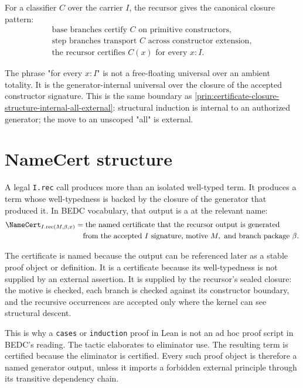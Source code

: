 For a classifier $C$ over the carrier $I$, the recursor gives the canonical closure pattern:
$$
\begin{aligned}
\text{base branches certify } C \text{ on primitive constructors},\\
\text{step branches transport } C \text{ across constructor extension},\\
\hline
\text{the recursor certifies } C(x) \text{ for every } x:I.
\end{aligned}
$$

The phrase "for every $x:I$" is not a free-floating universal over an ambient totality. It is the generator-internal universal over the closure of the accepted constructor signature. This is the same boundary as \autoref{prin:certificate-closure-structure-internal-all-external}: structural induction is internal to an authorized generator; the move to an unscoped "all" is external.

\section{NameCert structure}
\label{sec:recursor-namecert-structure}

A legal \texttt{I.rec} call produces more than an isolated well-typed term. It produces a term whose well-typedness is backed by the closure of the generator that produced it. In BEDC vocabulary, that output is a \NameCert{} at the relevant name:
$$
\begin{aligned}
\NameCert_{I.\mathrm{rec}(M,\beta,x)}
  &= \text{the named certificate that the recursor output is generated}\\
  &\quad \text{from the accepted } I \text{ signature, motive } M,
        \text{ and branch package } \beta.
\end{aligned}
$$

The certificate is named because the output can be referenced later as a stable proof object or definition. It is a certificate because its well-typedness is not supplied by an external assertion. It is supplied by the recursor's sealed closure: the motive is checked, each branch is checked against its constructor boundary, and the recursive occurrences are accepted only where the kernel can see structural descent.

This is why a \texttt{cases} or \texttt{induction} proof in Lean is not an ad hoc proof script in BEDC's reading. The tactic elaborates to eliminator use. The resulting term is certified because the eliminator is certified. Every such proof object is therefore a named generator output, unless it imports a forbidden external principle through its transitive dependency chain.

